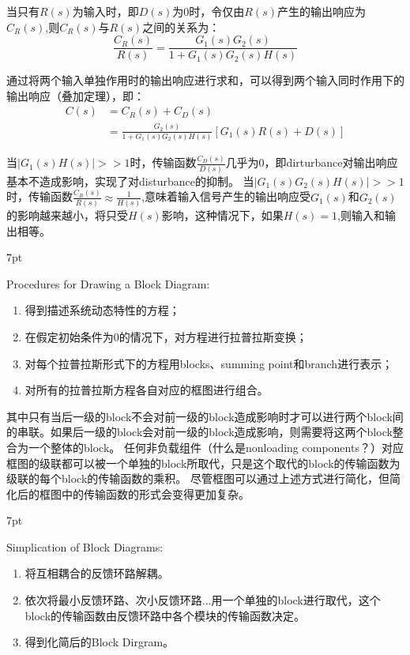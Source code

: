 \documentclass{article}
\numberwithin{equation}{section}
\numberwithin{figure}{section}
\newenvironment{formal}{%
\def\FrameCommand{%
\hspace{1pt}%
{\color{DarkBlue}\vrule width 2pt}%
{\color{formalshade}\vrule width 4pt}%
\colorbox{formalshade}%
}%
\MakeFramed{\advance\hsize-\width\FrameRestore}%
\noindent\hspace{-4.55pt}%
\begin{adjustwidth}{}{7pt}%
\vspace{2pt}\vspace{2pt}%
}
{%
\vspace{2pt}\end{adjustwidth}\endMakeFramed%
}
\begin{document}
当只有$R(s)$为输入时，即$D(s)$为0时，令仅由$R(s)$产生的输出响应为$C_R(s)$,则$C_R(s)$与$R(s)$之间的关系为：
\begin{equation}
    \frac{C_R(s)}{R(s)}=\frac{G_1(s)G_2(s)}{1+G_1(s)G_2(s)H(s)}
\end{equation}

通过将两个输入单独作用时的输出响应进行求和，可以得到两个输入同时作用下的输出响应（叠加定理），即：
\begin{equation}
    \begin{split}
        C(s)&=C_R(s)+C_D(s)\\
        &=\frac{G_2(s)}{1+G_1(s)G_2(s)H(s)}[G_1(s)R(s)+D(s)]
    \end{split}
\end{equation}

当$|G_1(s)H(s)|>>1$时，传输函数$\frac{C_D(s)}{D(s)}$几乎为0，即dirturbance对输出响应基本不造成影响，实现了对disturbance的抑制。
当$|G_1(s)G_2(s)H(s)|>>1$时，传输函数$\frac{C_R(s)}{R(s)}≈\frac{1}{H(s)}$,意味着输入信号产生的输出响应受$G_1(s)$和$G_2(s)$的影响越来越小，将只受$H(s)$影响，这种情况下，如果$H(s)=1$,则输入和输出相等。

\begin{formal}
    Procedures for Drawing a Block Diagram:
    \begin{enumerate}
        \item 得到描述系统动态特性的方程；
        \item 在假定初始条件为0的情况下，对方程进行拉普拉斯变换；
        \item 对每个拉普拉斯形式下的方程用blocks、summing point和branch进行表示；
        \item 对所有的拉普拉斯方程各自对应的框图进行组合。
    \end{enumerate}
\end{formal}
其中只有当后一级的block不会对前一级的block造成影响时才可以进行两个block间的串联。如果后一级的block会对前一级的block造成影响，则需要将这两个block整合为一个整体的block。
任何非负载组件（什么是nonloading components？）对应框图的级联都可以被一个单独的block所取代，只是这个取代的block的传输函数为级联的每个block的传输函数的乘积。
尽管框图可以通过上述方式进行简化，但简化后的框图中的传输函数的形式会变得更加复杂。

\begin{formal}
    Simplication of Block Diagrams:
    \begin{enumerate}
        \item 将互相耦合的反馈环路解耦。
        \item 依次将最小反馈环路、次小反馈环路...用一个单独的block进行取代，这个block的传输函数由反馈环路中各个模块的传输函数决定。
        \item 得到化简后的Block Dirgram。
    \end{enumerate}
\end{formal}
\end{document}
